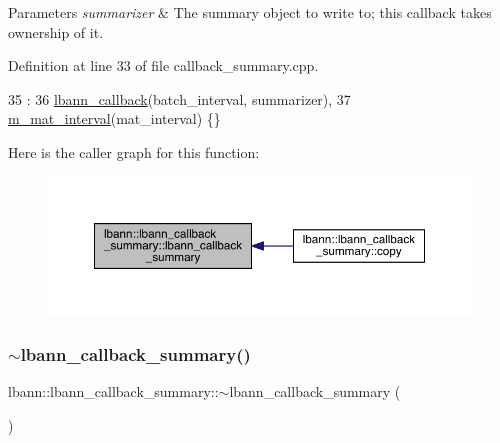 \begin{DoxyParams}{Parameters}
{\em summarizer} & The summary object to write to; this callback takes ownership of it. \\
\hline
\end{DoxyParams}


Definition at line 33 of file callback\+\_\+summary.\+cpp.


\begin{DoxyCode}
35                                                                  :
36   \hyperlink{classlbann_1_1lbann__callback_a679057298a41ddd47f08c157f756c584}{lbann\_callback}(batch\_interval, summarizer),
37   \hyperlink{classlbann_1_1lbann__callback__summary_ad123c5383ce6fe1212e25021579d6e3d}{m\_mat\_interval}(mat\_interval) \{\}
\end{DoxyCode}
Here is the caller graph for this function\+:\nopagebreak
\begin{figure}[H]
\begin{center}
\leavevmode
\includegraphics[width=350pt]{classlbann_1_1lbann__callback__summary_aaf405a703a4047cc3c442d0a21a5d208_icgraph}
\end{center}
\end{figure}
\mbox{\label{classlbann_1_1lbann__callback__summary_afecb595caaee55e32837840ba902eaee}} 
\subsubsection{\texorpdfstring{$\sim$lbann\+\_\+callback\+\_\+summary()}{~lbann\_callback\_summary()}}
{\footnotesize\ttfamily lbann\+::lbann\+\_\+callback\+\_\+summary\+::$\sim$lbann\+\_\+callback\+\_\+summary (\begin{DoxyParamCaption}{ }\end{DoxyParamCaption})\hspace{0.3cm}{\ttfamily [override]}}



